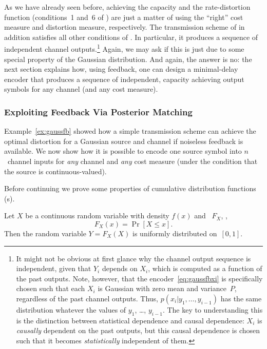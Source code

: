As we have already seen before, achieving the capacity and the
rate-dis\-tor\-tion function (conditions~1 and~6 of
) are just a matter of using the ``right'' cost
measure and distortion measure, respectively. The transmission scheme of
 in addition satisfies all other conditions of
. In particular, it produces a sequence of
independent channel outputs.\footnote{It might not be obvious at first glance
why the channel output sequence is independent, given that $Y_i$ depends on
$X_i$, which is computed as a function of the past outputs. Note, however, that
the encoder~\eqref{eq:gaussfbxi} is specifically chosen such that each $X_i$ is
Gaussian with zero mean and variance~$P$, regardless of the past channel
outputs. Thus, $p(x_i | y_1, \dots, y_{i-1})$ has the same distribution whatever
the values of $y_1$, \dots, $y_{i-1}$. The key to understanding this is the
distinction between statistical dependence and causal dependence: $X_i$ is
\emph{causally} dependent on the past outputs, but this causal dependence is
chosen such that it becomes \emph{statistically} independent of them.}
Again, we may ask if this is just due to some
special property of the Gaussian distribution. And again, the answer is no: the
next section explains how, using feedback, one can design a minimal-delay
encoder that produces a sequence of independent, capacity achieving output
symbols for any channel (and any cost measure).


\subsubsection{Exploiting Feedback Via Posterior Matching}

Example~\ref{ex:gaussfb} showed how a simple transmission scheme can achieve the
optimal distortion for a Gaussian source and channel if noiseless feedback is
available.  We now show how it is possible to encode one source symbol into
$n$~channel inputs for \emph{any} channel and \emph{any} cost measure (under the
condition that the source is continuous-valued).

Before continuing we prove some properties of cumulative distribution functions
(\cdf s).

\begin{lemma}
  \label{lem:cdfunif}
  Let $X$ be a continuous random variable with density $f(x)$ and \cdf\ $F_X$,
  \ie,
  \begin{equation*}
    F_X(x) = \Pr[X \le x].
  \end{equation*}
  Then the random variable $Y = F_X(X)$ is uniformly distributed on~$[0,1]$.
\end{lemma}

